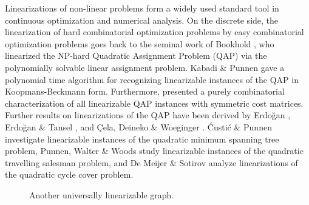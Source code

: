 \documentclass[runningheads]{llncs}
\begin{document}
Linearizations of non-linear problems form a widely used standard tool in continuous 
optimization and numerical analysis.
On the discrete side, the linearization of hard combinatorial optimization problems by easy 
combinatorial optimization problems goes back to the seminal work of Bookhold \cite{Bo1990}, 
who linearized the NP-hard Quadratic Assignment Problem (QAP) via the polynomially solvable 
linear assignment problem.
Kabadi \& Punnen \cite{KaPu2011,PuKa2013} gave a polynomial time algorithm for recognizing 
linearizable instances of the QAP in Koopmans-Beckmann form.
Furthermore, \cite{PuKa2013} presented a purely combinatorial characterization of all linearizable
QAP instances with symmetric cost matrices.
Further results on linearizations of the QAP have been derived by
Erdo\u{g}an \cite{Erdogan2006}, Erdo\u{g}an \& Tansel \cite{ErTa2007,ErTa2011}, and 
\c{C}ela, Deineko \& Woeginger \cite{CeDeWo2016}.
{\'C}usti{\'c} \& Punnen \cite{CuPu2016} investigate linearizable instances of the quadratic minimum spanning tree problem,
Punnen, Walter \& Woods \cite{PuWaWo2013} study linearizable instances of the quadratic travelling salesman problem, and
De Meijer \& Sotirov \cite{deMeSo2020} analyze linearizations of the quadratic cycle cover problem.

\begin{figure}[bth]
\begin{center}
\end{center}
\vspace{-3.5ex}
\caption{Another universally linearizable graph.}
\label{fig:example2}
\end{figure}
\end{document}
